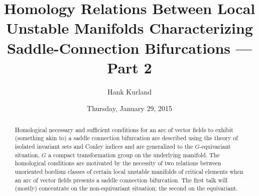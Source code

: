 \documentclass{UAmathtalk}
\author{Hank Kurland}
\title{Homology Relations Between Local Unstable Manifolds Characterizing Saddle-Connection Bifurcations --- Part 2}
\date{Thursday, January 29, 2015}
\begin{document}
\maketitle

\begin{abstract}
Homological necessary and sufficient conditions for an arc of vector fields to exhibit (something akin to) a saddle connection bifurcation are described using the theory of isolated invariant sets and Conley indices and are generalized to the $G$-equivariant situation, $G$ a compact transformation group on the underlying manifold.
The homological conditions are motivated by the necessity of two relations between unoriented bordism classes of certain local unstable manifolds of critical elements when an arc of vector fields presents a saddle connection bifurcation.
The first talk will (mostly) concentrate on the non-equivariant situation; the second on the equivariant.
\end{abstract}
\end{document}
